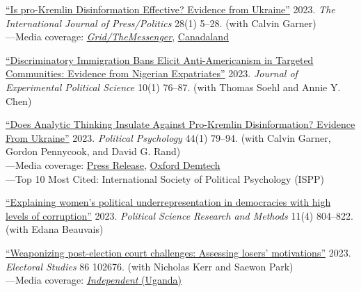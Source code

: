 \begin{etaremune}
  \item \href{https://doi.org/10.1177/19401612211045221}{``Is pro-Kremlin Disinformation Effective? Evidence from Ukraine''} 2023. \textit{The International Journal of Press/Politics} 28(1) 5–28. (with Calvin Garner) \\
    ---Media coverage: \href{https://web.archive.org/web/20240110204946/https://themessenger.com/grid/autopsied-bodies-and-false-flags-how-pro-russian-disinformation-spreads-chaos-in-ukraine}{\textit{Grid/TheMessenger}}, \href{https://www.canadaland.com/podcast/760-russias-weapons-of-mass-deception/}{Canadaland}

  \item \href{https://doi.org/10.1017/xps.2021.26}{``Discriminatory Immigration Bans Elicit Anti-Americanism in Targeted Communities: Evidence from Nigerian Expatriates''} 2023. \textit{Journal of Experimental Political Science} 10(1) 76–87. (with Thomas Soehl and Annie Y. Chen)

  \item \href{https://onlinelibrary.wiley.com/doi/abs/10.1111/pops.12819}{``Does Analytic Thinking Insulate Against Pro-Kremlin Disinformation? Evidence From Ukraine''} 2023. \textit{Political Psychology} 44(1) 79–94. (with Calvin Garner, Gordon Pennycook, and David G. Rand) \\
    ---Media coverage: \href{https://www.prnewswire.com/news-releases/ukrainians-who-engage-in-more-analytic-thinking-are-less-susceptible-to-russias-disinformation-campaign-301488184.html}{Press Release}, \href{https://web.archive.org/web/20240624183718/https://demtech.oii.ox.ac.uk/war-in-ukraine-and-disinformation-newsletter-29-march-2022/}{Oxford Demtech} \\
    ---Top 10 Most Cited: International Society of Political Psychology (ISPP)

  \item \href{https://doi.org/10.1017/psrm.2022.46}{``Explaining women's political underrepresentation in democracies with high levels of corruption''} 2023. \textit{Political Science Research and Methods} 11(4) 804–822. (with Edana Beauvais)

  \item \href{https://www.sciencedirect.com/science/article/pii/S0261379423000987}{``Weaponizing post-election court challenges: Assessing losers’ motivations''} 2023. \textit{Electoral Studies} 86 102676. (with Nicholas Kerr and Saewon Park) \\
    ---Media coverage: \href{https://web.archive.org/web/20220516083222/https://www.independent.co.ug/court-cant-reverse-museveni-election-win/}{\textit{Independent} (Uganda)}


\end{etaremune}
